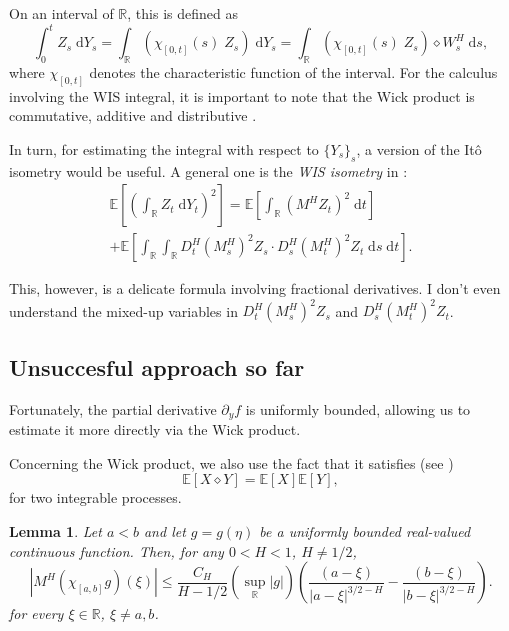 \documentclass[reqno,12pt]{amsart}
\theoremstyle{plain}%
\newtheorem{lem}{Lemma}[section]
\theoremstyle{definition}
\begin{document}
On an interval of $\mathbb{R}$, this is defined as
\begin{equation}
    \label{defWISintegral}
    \int_0^t Z_s\;\mathrm{d}Y_s = \int_\mathbb{R} \left(\chi_{[0, t]}(s) \;Z_s \right)\;\mathrm{d}Y_s = \int_\mathbb{R} \left(\chi_{[0, t]}(s) \;Z_s \right)\diamond W_s^H \;\mathrm{d}s,
\end{equation}
where $\chi_{[0, t]}$ denotes the characteristic function of the interval. For the calculus involving the WIS integral, it is important to note that the Wick product is commutative, additive and distributive \cite[Definition A.1.7]{BHOB2008}.

In turn, for estimating the integral with respect to $\{Y_s\}_s$, a version of the It\^o isometry would be useful. A general one is the \emph{WIS isometry} in \cite[Theorem 4.5.6]{BHOB2008}:
\begin{multline}
    \label{WISisometry}
    \mathbb{E}\left[\left(\int_\mathbb{R} Z_t \;\mathrm{d}Y_t\right)^2\right] = \mathbb{E}\left[\int_\mathbb{R} (M^H Z_t)^2 \;\mathrm{d}t\right] \\
    + \mathbb{E}\left[ \int_\mathbb{R}\int_\mathbb{R} D_t^H (M_s^H)^2Z_s \cdot D_s^H(M_t^H)^2 Z_t\;\mathrm{d}s \;\mathrm{d}t \right].
\end{multline}


This, however, is a delicate formula involving fractional derivatives. I don't even understand the mixed-up variables in $D_t^H (M_s^H)^2Z_s$ and $D_s^H(M_t^H)^2 Z_t$.

\subsection{Unsuccesful approach so far} 

Fortunately, the partial derivative $\partial_y f$ is uniformly bounded, allowing us to estimate it more directly via the Wick product.

Concerning the Wick product, we also use the fact that it satisfies (see \cite[Corollary 2.10]{GHLOUZ1993})
\begin{equation}
    \label{expectationWick}
    \mathbb{E}[X \diamond Y] = \mathbb{E}[X] \mathbb{E}[Y],
\end{equation}
for two integrable processes.

\begin{lem}
    \label{estimateMchibounded}
    Let $a < b$ and let $g=g(\eta)$ be a uniformly bounded real-valued continuous function. Then, for any $0 < H < 1$, $H \neq 1/2$,
    \[
        \left|M^H (\chi_{[a, b]}g)(\xi)\right| \leq \frac{C_H}{H - 1/2} (\sup_\mathbb{R} |g|) \left( \frac{(a - \xi)}{|a - \xi|^{3/2 - H}} - \frac{(b - \xi)}{|b - \xi|^{3/2 - H}}\right).
    \]
    for every $\xi\in \mathbb{R}$, $\xi \neq a, b$.
\end{lem}
\end{document}
